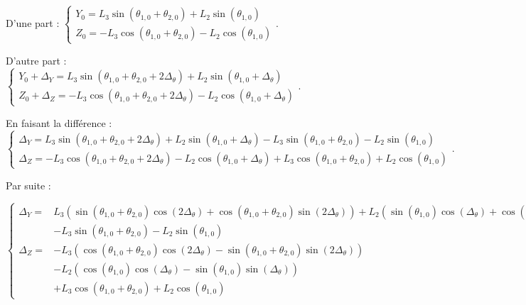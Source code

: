 \documentclass[11pt]{article}
\begin{document}
\begin{UPSTIcorrige}
D'une part : 
$
\left\{
\begin{array}{l}
Y_0 =  L_3 \sin  \left(\theta_{1,0}+ \theta_{2,0} \right)  + L_2 \sin \left(\theta_{1,0}  \right) \\
Z_0 =- L_3 \cos \left(\theta_{1,0} + \theta_{2,0} \right) - L_2 \cos \left(\theta_{1,0} \right)  
\end{array}.
\right.
$


D'autre part : 
$
\left\{
\begin{array}{l}
Y_0 +\Delta_{Y}=  L_3 \sin  \left(\theta_{1,0}+ \theta_{2,0} + 2\Delta_{\theta} \right)  + L_2 \sin \left(\theta_{1,0} + \Delta_{\theta} \right) \\
Z_0 +\Delta_{Z}=- L_3 \cos \left(\theta_{1,0} + \theta_{2,0}+ 2\Delta_{\theta} \right) - L_2 \cos \left(\theta_{1,0}+\Delta_{\theta} \right)  
\end{array}.
\right.
$

En faisant la différence :
$
\left\{
\begin{array}{l}
\Delta_{Y}=  L_3 \sin  \left(\theta_{1,0}+ \theta_{2,0} + 2\Delta_{\theta} \right)  + L_2 \sin \left(\theta_{1,0} + \Delta_{\theta} \right)  - L_3 \sin  \left(\theta_{1,0}+ \theta_{2,0} \right)  - L_2 \sin \left(\theta_{1,0}  \right)\\
\Delta_{Z}=- L_3 \cos \left(\theta_{1,0} + \theta_{2,0}+ 2\Delta_{\theta} \right) - L_2 \cos \left(\theta_{1,0}+\Delta_{\theta} \right)   +  L_3 \cos \left(\theta_{1,0} + \theta_{2,0} \right) + L_2 \cos \left(\theta_{1,0} \right)
\end{array}.
\right.
$

Par suite : 

$
\left\{
\begin{array}{ll}
\Delta_{Y}=&   L_3 \left( \sin \left(\theta_{1,0}+ \theta_{2,0} \right) \cos \left( 2\Delta_{\theta} \right) + \cos \left(\theta_{1,0}+ \theta_{2,0}\right) \sin \left(2\Delta_{\theta} \right)\right) 
+ L_2 \left( \sin \left(\theta_{1,0} \right) \cos \left( \Delta_{\theta} \right) + \cos \left(\theta_{1,0}\right) \sin \left(\Delta_{\theta} \right)\right) \\
& - L_3 \sin  \left(\theta_{1,0}+ \theta_{2,0} \right)  - L_2 \sin \left(\theta_{1,0}  \right)\\
\Delta_{Z}=
&- L_3 \left(\cos \left(\theta_{1,0} + \theta_{2,0}\right) \cos\left(2\Delta_{\theta} \right)
- \sin \left(\theta_{1,0} + \theta_{2,0}\right) \sin\left(2\Delta_{\theta} \right) \right) \\
&- L_2 \left(\cos \left(\theta_{1,0} \right) \cos\left(\Delta_{\theta} \right)
- \sin \left(\theta_{1,0} \right) \sin\left(\Delta_{\theta} \right) \right)\\
&  +  L_3 \cos \left(\theta_{1,0} + \theta_{2,0} \right) + L_2 \cos \left(\theta_{1,0} \right)
\end{array}.
\right.
$


\end{UPSTIcorrige}
\end{document}
